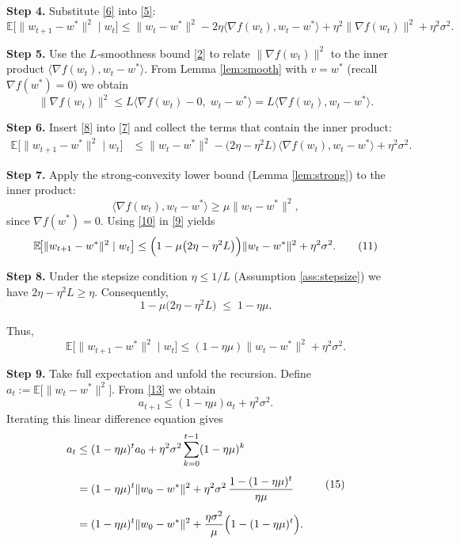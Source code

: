 \documentclass[11pt]{article}
\newcommand{\E}{\mathbb{E}}
\begin{document}
\noindent\textbf{Step 4.} Substitute \eqref{6} into \eqref{5}:
\[
\E\!\big[\|w_{t+1}-w^{*}\|^{2}\mid w_{t}\big]
\le \|w_{t}-w^{*}\|^{2}
-2\eta\langle \nabla f(w_{t}),w_{t}-w^{*}\rangle
+\eta^{2}\|\nabla f(w_{t})\|^{2}
+\eta^{2}\sigma^{2}.
\tag{7}
\]

\noindent\textbf{Step 5.} Use the $L$‑smoothness bound \eqref{2} to relate $\|\nabla f(w_{t})\|^{2}$ to the inner product $\langle\nabla f(w_{t}),w_{t}-w^{*}\rangle$.
From Lemma \ref{lem:smooth} with $v=w^{*}$ (recall $\nabla f(w^{*})=0$) we obtain
\[
\|\nabla f(w_{t})\|^{2}
\le L\langle\nabla f(w_{t})-0,\;w_{t}-w^{*}\rangle
= L\langle\nabla f(w_{t}),w_{t}-w^{*}\rangle .
\tag{8}
\]

\noindent\textbf{Step 6.} Insert \eqref{8} into \eqref{7} and collect the terms that contain the inner product:
\[
\begin{aligned}
\E\!\big[\|w_{t+1}-w^{*}\|^{2}\mid w_{t}\big]
&\le \|w_{t}-w^{*}\|^{2}
-\bigl(2\eta-\eta^{2}L\bigr)\,\langle\nabla f(w_{t}),w_{t}-w^{*}\rangle
+\eta^{2}\sigma^{2}.
\end{aligned}
\tag{9}
\]

\noindent\textbf{Step 7.} Apply the strong‑convexity lower bound (Lemma \ref{lem:strong}) to the inner product:
\[
\langle\nabla f(w_{t}),w_{t}-w^{*}\rangle
\ge \mu\|w_{t}-w^{*}\|^{2},
\tag{10}
\]
since $\nabla f(w^{*})=0$.
Using \eqref{10} in \eqref{9} yields
\[
\E\!\big[\|w_{t+1}-w^{*}\|^{2}\mid w_{t}\big]
\le \Bigl(1-\mu\bigl(2\eta-\eta^{2}L\bigr)\Bigr)\|w_{t}-w^{*}\|^{2}
+\eta^{2}\sigma^{2}.
\tag{11}
\]

\noindent\textbf{Step 8.} Under the stepsize condition $\eta\le 1/L$ (Assumption \ref{ass:stepsize}) we have $2\eta-\eta^{2}L\ge \eta$. Consequently,
\[
1-\mu\bigl(2\eta-\eta^{2}L\bigr)\;\le\;1-\eta\mu .
\tag{12}
\]

Thus,
\[
\E\!\big[\|w_{t+1}-w^{*}\|^{2}\mid w_{t}\big]
\le (1-\eta\mu)\|w_{t}-w^{*}\|^{2}+\eta^{2}\sigma^{2}.
\tag{13}
\]

\noindent\textbf{Step 9.} Take full expectation and unfold the recursion. Define $a_{t}:=\E\!\big[\|w_{t}-w^{*}\|^{2}\big]$. From \eqref{13} we obtain
\[
a_{t+1}\le (1-\eta\mu)a_{t}+\eta^{2}\sigma^{2}.
\tag{14}
\]
Iterating this linear difference equation gives
\[
\begin{aligned}
a_{t}
&\le (1-\eta\mu)^{t}a_{0}
+ \eta^{2}\sigma^{2}\sum_{k=0}^{t-1}(1-\eta\mu)^{k}\\[4pt]
&= (1-\eta\mu)^{t}\|w_{0}-w^{*}\|^{2}
+ \eta^{2}\sigma^{2}\,\frac{1-(1-\eta\mu)^{t}}{\eta\mu}\\[4pt]
&= (1-\eta\mu)^{t}\|w_{0}-w^{*}\|^{2}
+ \frac{\eta\sigma^{2}}{\mu}\Bigl(1-(1-\eta\mu)^{t}\Bigr).
\end{aligned}
\tag{15}
\]
\end{document}
